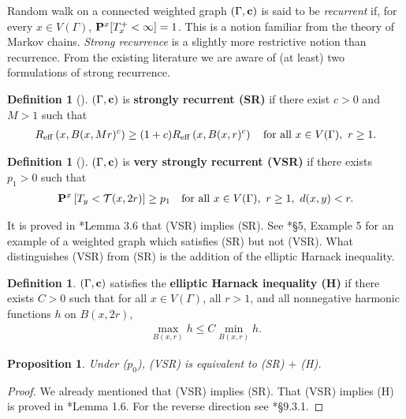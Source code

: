 \documentclass[11pt]{amsart}
\theoremstyle{plain}
\newtheorem{proposition}[lemma]{Proposition}
\theoremstyle{definition}
\newtheorem{definition}[lemma]{Definition}
\theoremstyle{remark}
\begin{document}
Random walk on a connected weighted graph $(\Gamma,{\bf c})$ is said to be \emph{recurrent} if, for every $x\in V(\Gamma)$, ${\bf P}^x[T_x^+ <\infty]=1$. This is a notion familiar from the theory of Markov chains. \emph{Strong recurrence} is a slightly more restrictive notion than recurrence. From the existing literature we are aware of (at least) two formulations of strong recurrence.

\begin{definition}[\cites{Telcs01,Telcs01_2}]
\label{def:SR}
$(\Gamma, {\bf c})$ is \textbf{strongly recurrent (SR)} if there exist $c>0$ and $M>1$ such that
\begin{align}
R_{\rm eff}\left(x, B(x,Mr)^c\right) \geq (1+c) R_{\rm eff}\left(x, B(x,r)^c\right) \quad \text{for all}~x\in V(\Gamma), ~r\geq 1.
\end{align}
\end{definition}

\begin{definition}[\cites{Delmotte,BarlowValues}]
\label{def:VSR}
$(\Gamma, {\bf c})$ is \textbf{very strongly recurrent (VSR)} if there exists $p_1>0$ such that
\begin{align}
{\bf P}^x\left[T_y< \mathcal{T}(x,2r)\right] \geq p_1 \quad \text{for all}~x\in V(\Gamma),~r\geq 1, ~d(x,y) < r.
\end{align}
\end{definition}

It is proved in \cite{BCK05}*{Lemma 3.6} that (VSR) implies (SR). See \cite{BCK05}*{\S5, Example 5} for an example of a weighted graph which satisfies (SR) but not (VSR). What distinguishes (VSR) from (SR) is the addition of the elliptic Harnack inequality.

\begin{definition}
$(\Gamma, {\bf c})$ satisfies the \textbf{elliptic Harnack inequality (H)} if there exists $C>0$ such that for all $x\in V(\Gamma)$, all $r>1$, and all nonnegative harmonic functions $h$ on $B(x,2r)$,
\begin{align}
\max_{B(x,r)} h \leq C \min_{B(x,r)} h.
\end{align}
\end{definition}

\begin{proposition}
\label{prop:VSRSR}
Under ($p_0$), (VSR) is equivalent to (SR) $+$ (H).
\end{proposition}
\begin{proof}
We already mentioned that (VSR) implies (SR). That (VSR) implies (H) is proved in \cite{BarlowValues}*{Lemma 1.6}. 
For the reverse direction see \cite{TelcsBook}*{\S9.3.1}.
\end{proof}
\end{document}
